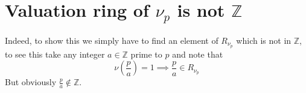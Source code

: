 \documentclass[11pt, a4paper]{article}
\begin{document}
\section{Valuation ring of $\nu_p$ is not $ \mathbb{Z}$ }
Indeed, to show this we simply have to find an element of $ R_{ \nu_p }$ which is not in $ \mathbb{Z}$, to see this take any integer $a\in \mathbb{Z}$ prime to $p$ and note that
\[ 
\nu( \frac{p}{a}) = 1\implies \frac{p}{a}\in R_{\nu_p} 	
\]
But obviously $\frac{p}{a}\notin \mathbb{Z} $.
\end{document}
